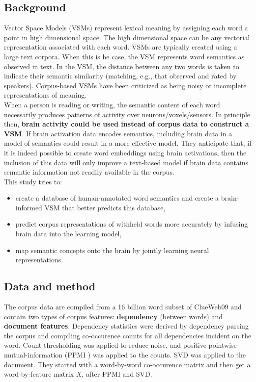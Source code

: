 \subsection{Background}
Vector Space Models (VSMs) represent lexical meaning by assigning each word a point in high dimensional space. The high dimensional space can be any vectorial representation associated with each word. VSMs are typically created using a large text corpora. When this is he case, the VSM represents word semantics as observed in text. In the VSM, the distance between any two words is taken to indicate their semantic similarity (matching, e.g., that observed and rated by speakers). Corpus-based VSMs have been criticized as being noisy or incomplete representations of meaning.\\

When a person is reading or writing, the semantic content of each word necessarily produces patterns of activity over neurons/voxels/sensors. In principle then, \textbf{brain activity could be used instead of corpus data to construct a VSM}. If brain activation data encodes semantics, including brain data in a model of semantics could result in a more effective model. They anticipate that, if it is indeed possible to create word embeddings using brain activations, then the inclusion of this data will only improve a text-based model if brain data contains semantic information not readily available in the corpus.\\

This study tries to:
\begin{itemize}
    \item create a database of human-annotated word semantics and create a brain-informed VSM that better predicts this database,
    \item predict corpus representations of withheld words more accurately by infusing brain data into the learning model,
    \item map semantic concepts onto the brain by jointly learning neural representations.
\end{itemize}

\subsection{Data and method}
The corpus data are compiled from a 16 billion word subset of ClueWeb09 and contain two types of corpus features: \textbf{dependency} (between words) and \textbf{document features}. Dependency statistics were derived by dependency parsing the corpus and compiling co-occurence counts for all dependencies incident on the word. Count thresholding was applied to reduce noise, and positive pointwise mutual-information (PPMI \notet) was applied to the counts. SVD was applied to the document. They started with a word-by-word co-occurence matrix and then get a word-by-feature matrix $X$, after PPMI and SVD.

